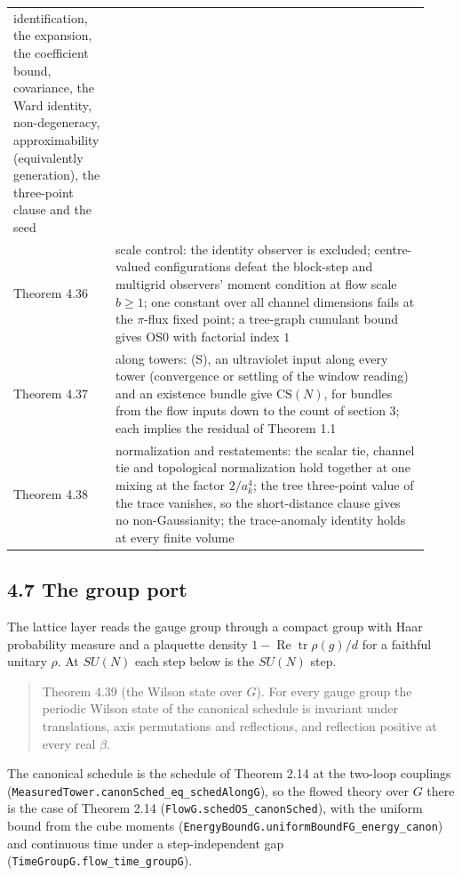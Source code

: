 \documentclass[10pt,letterpaper,twocolumn]{article}
\begin{document}
\begin{center}
{\begin{xtabular}{L{0.207\linewidth}L{0.724\linewidth}}
identification, the expansion, the coefficient bound, covariance, the
Ward identity, non-degeneracy, approximability (equivalently
generation), the three-point clause and the seed \\
Theorem 4.36 & scale control: the identity observer is excluded; centre-valued
configurations defeat the block-step and multigrid observers' moment
condition at flow scale \(b\ge1\); one constant over all channel
dimensions fails at the \(\pi\)-flux fixed point; a tree-graph cumulant
bound gives OS0 with factorial index \(1\) \\
Theorem 4.37 & along towers: (S), an ultraviolet input along every tower (convergence
or settling of the window reading) and an existence bundle give
\(\mathrm{CS}(N)\), for bundles from the flow inputs down to the count
of section 3; each implies the residual of Theorem 1.1 \\
Theorem 4.38 & normalization and restatements: the scalar tie, channel tie and
topological normalization hold together at one mixing at the factor
\(2/a_k^4\); the tree three-point value of the trace vanishes, so the
short-distance clause gives no non-Gaussianity; the trace-anomaly
identity holds at every finite volume \\
\end{xtabular}
}
\end{center}

\subsection{4.7 The group port}\label{47-the-group-port}

The lattice layer reads the gauge group through a compact group with Haar probability measure and a plaquette density \(1-\operatorname{Re}\operatorname{tr}\rho(g)/d\) for a faithful unitary \(\rho\). At \(SU(N)\) each step below is the \(SU(N)\) step.

\begin{quote}
Theorem 4.39 (the Wilson state over \(G\)). For every gauge group the periodic Wilson state of the canonical schedule is invariant under translations, axis permutations and reflections, and reflection positive at every real \(\beta\).
\end{quote}

The canonical schedule is the schedule of Theorem 2.14 at the two-loop couplings (\texttt{MeasuredTower.\allowbreak{}canonSched\_\allowbreak{}eq\_\allowbreak{}schedAlongG}), so the flowed theory over \(G\) there is the case of Theorem 2.14 (\texttt{FlowG.\allowbreak{}schedOS\_\allowbreak{}canonSched}), with the uniform bound from the cube moments (\texttt{EnergyBoundG.\allowbreak{}uniformBoundFG\_\allowbreak{}energy\_\allowbreak{}canon}) and continuous time under a step-independent gap (\texttt{TimeGroupG.\allowbreak{}flow\_\allowbreak{}time\_\allowbreak{}groupG}).
\end{document}
